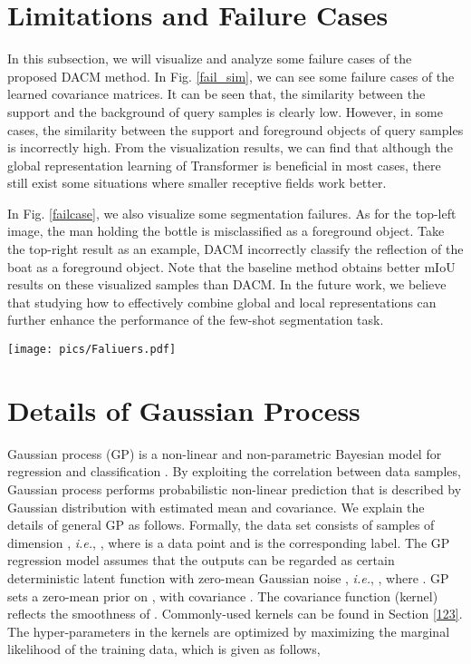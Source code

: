\documentclass[runningheads]{llncs}
\begin{document}
\section{Limitations and Failure Cases}
In this subsection, we will visualize and analyze some failure cases of the proposed DACM method. In Fig. \ref{fail_sim}, we can see some failure cases of the learned covariance matrices. It can be seen that, the similarity between the support and the background of query samples is clearly low. However, in some cases, the similarity between the support and foreground objects of query samples is incorrectly high. From the visualization results, we can find that although the global representation learning of Transformer is beneficial in most cases, there still exist some situations where smaller receptive fields work better. 

In Fig. \ref{failcase}, we also visualize some segmentation failures. As for the top-left image, the man holding the bottle is misclassified as a foreground object. Take the top-right result as an example, DACM incorrectly classify the reflection of the boat as a foreground object. Note that the baseline method obtains better mIoU results on these visualized samples than DACM. In the future work, we believe that studying how to effectively combine global and local representations can further enhance the performance of the few-shot segmentation task.

\begin{figure*}[t]
	\centering
	\texttt{[image: pics/Faliuers.pdf]}
	\caption{Visualization of some failure cases of 1-shot segmentation results.
}
	\label{failcase}
\end{figure*}

\section{Details of Gaussian Process}

Gaussian process (GP) is a non-linear and non-parametric Bayesian model for regression and classification \cite{williams1996gaussian}. By exploiting the correlation between data samples, Gaussian process performs probabilistic non-linear prediction that is described by Gaussian distribution with estimated mean and covariance. We explain the details of general GP as follows. Formally, the data set consists of  samples of dimension , \textit{i.e.}, , where  is a data point and  is the corresponding label. The GP regression model assumes that the outputs  can be regarded as certain deterministic latent function  with zero-mean Gaussian noise , \textit{i.e.}, , where . GP sets a zero-mean prior on , with covariance . The covariance function (kernel)  reflects the smoothness of . Commonly-used kernels can be found in Section \ref{123}. The hyper-parameters in the kernels are optimized by maximizing the marginal likelihood of the training data, which is given as follows,
\end{document}
